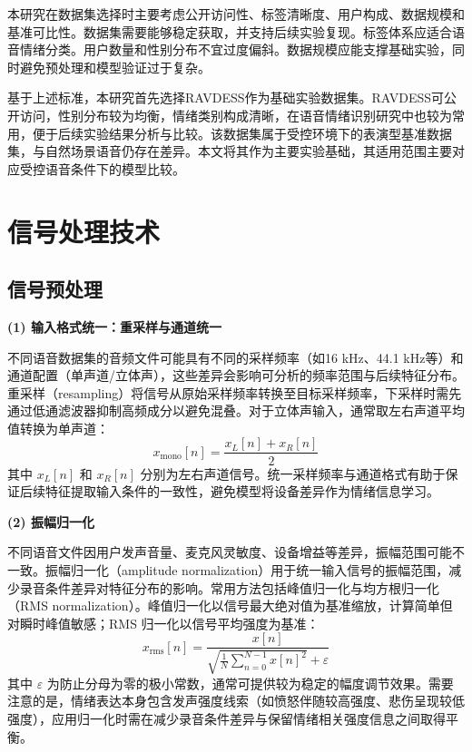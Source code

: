 本研究在数据集选择时主要考虑公开访问性、标签清晰度、用户构成、数据规模和基准可比性。数据集需要能够稳定获取，并支持后续实验复现。标签体系应适合语音情绪分类。用户数量和性别分布不宜过度偏斜。数据规模应能支撑基础实验，同时避免预处理和模型验证过于复杂。

基于上述标准，本研究首先选择RAVDESS作为基础实验数据集。RAVDESS可公开访问，性别分布较为均衡，情绪类别构成清晰，在语音情绪识别研究中也较为常用，便于后续实验结果分析与比较。该数据集属于受控环境下的表演型基准数据集，与自然场景语音仍存在差异。本文将其作为主要实验基础，其适用范围主要对应受控语音条件下的模型比较。


\section{信号处理技术}

\subsection{信号预处理}

\textbf{(1) 输入格式统一：重采样与通道统一}

不同语音数据集的音频文件可能具有不同的采样频率（如16 kHz、44.1 kHz等）和通道配置（单声道/立体声），这些差异会影响可分析的频率范围与后续特征分布。重采样（resampling）将信号从原始采样频率转换至目标采样频率，下采样时需先通过低通滤波器抑制高频成分以避免混叠。对于立体声输入，通常取左右声道平均值转换为单声道：
\begin{equation}
x_{\text{mono}}[n] = \frac{x_L[n] + x_R[n]}{2}
\end{equation}
其中 $x_L[n]$ 和 $x_R[n]$ 分别为左右声道信号。统一采样频率与通道格式有助于保证后续特征提取输入条件的一致性，避免模型将设备差异作为情绪信息学习\cite{leem2024selective,lin2023chunk}。

\textbf{(2) 振幅归一化}

不同语音文件因用户发声音量、麦克风灵敏度、设备增益等差异，振幅范围可能不一致。振幅归一化（amplitude normalization）用于统一输入信号的振幅范围，减少录音条件差异对特征分布的影响\cite{fan2022isnet,lin2023chunk}。常用方法包括峰值归一化与均方根归一化（RMS normalization）。峰值归一化以信号最大绝对值为基准缩放，计算简单但对瞬时峰值敏感；RMS 归一化以信号平均强度为基准：
\begin{equation}
x_{\text{rms}}[n] = \frac{x[n]}{\sqrt{\frac{1}{N}\sum_{n=0}^{N-1} x[n]^2} + \varepsilon}
\end{equation}
其中 $\varepsilon$ 为防止分母为零的极小常数，通常可提供较为稳定的幅度调节效果\cite{zhang2020transfer,leem2024selective,lin2023chunk}。需要注意的是，情绪表达本身包含发声强度线索（如愤怒伴随较高强度、悲伤呈现较低强度），应用归一化时需在减少录音条件差异与保留情绪相关强度信息之间取得平衡\cite{fan2022isnet,zhang2020transfer}。




